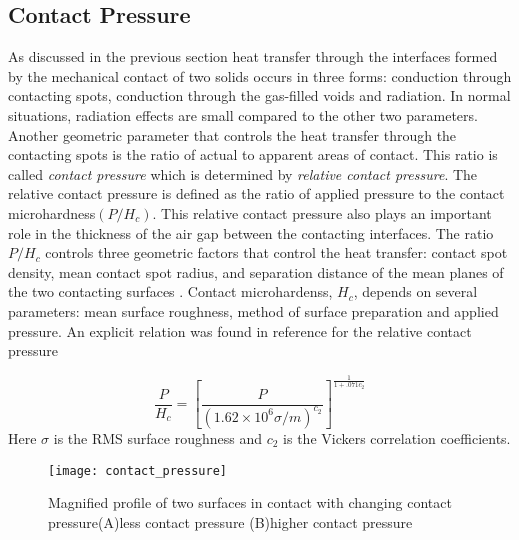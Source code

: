 \begin{doublespacing}
\section{Contact Pressure}
As discussed in the previous section heat transfer through the interfaces formed by the mechanical contact of two solids occurs in three forms: conduction through contacting spots, conduction through the gas-filled voids and radiation. In normal situations, radiation effects are small compared to the other two parameters. Another geometric parameter that controls the heat transfer through the contacting spots is the ratio of actual to apparent areas of contact. This ratio is called \textit{contact pressure} which is determined by \textit{relative contact pressure}. The relative contact pressure is defined as the ratio of applied pressure to the contact microhardness$(P/H_c)$. This relative contact pressure also plays an important role in the thickness of the air gap between the contacting interfaces. The ratio $P/H_c$ controls three geometric factors that control the heat transfer: contact spot density, mean contact spot radius, and separation distance of the mean planes of the two contacting surfaces \cite{song1988relative}. Contact microhardenss, $H_c$, depends on several parameters: mean surface roughness, method of surface preparation and applied pressure. An explicit relation was found in reference \cite{song1988relative} for the relative contact pressure 

\begin{equation}
\label{eq_contact_pres}
\frac{P}{H_c} = \left[\frac{P}{(1.62\times10^6 \sigma/m)^{c_2}} \right ]^\frac{1}{1+.071c_2}
\end{equation}
Here $\sigma$ is the RMS surface roughness and $c_2$ is the Vickers correlation coefficients.


\begin{figure}[H]
\centering
\texttt{[image: contact\_pressure]}
\caption{Magnified profile of two surfaces in contact with changing contact pressure(A)less contact pressure (B)higher contact pressure}
\label{fig_contact_pressure}
\end{figure}


\end{doublespacing}
